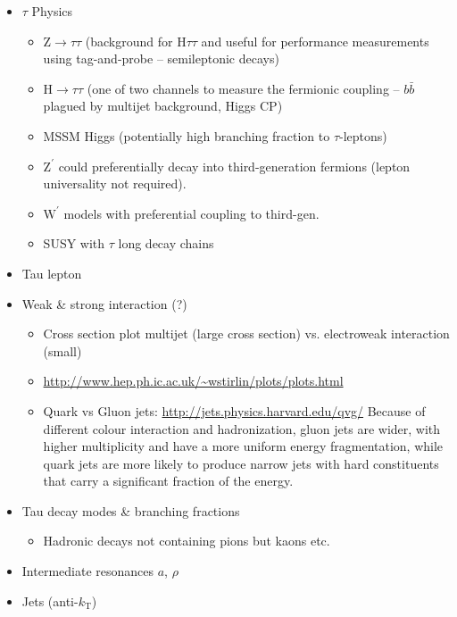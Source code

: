 \begin{itemize}
\begin{itemize}
\item $\tau$ Physics
  \begin{itemize}
  \item $\mathrm{Z} \rightarrow \tau \tau$ (background for H$\tau \tau$ and
    useful for performance measurements using tag-and-probe -- semileptonic
    decays)

  \item $\mathrm{H} \rightarrow \tau \tau$ (one of two channels to measure
    the fermionic coupling -- $b \bar{b}$ plagued by multijet background,
    Higgs CP)

  \item MSSM Higgs (potentially high branching fraction to $\tau$-leptons)

  \item $\mathrm{Z}^\prime$ could preferentially decay into third-generation
    fermions (lepton universality not required).

  \item $\mathrm{W}^\prime$ models with preferential coupling to third-gen.

  \item SUSY with $\tau$ \textrightarrow long decay chains
  \end{itemize}
\end{itemize}
\end{itemize}


\begin{itemize}
\item Tau lepton

\item Weak \& strong interaction (?)
  \begin{itemize}
  \item Cross section plot multijet (large cross section) vs.
    electroweak interaction (small)
  \item \url{http://www.hep.ph.ic.ac.uk/~wstirlin/plots/plots.html}
  \item Quark vs Gluon jets: \url{http://jets.physics.harvard.edu/qvg/}
    Because of different colour interaction and hadronization, gluon jets are
    wider, with higher multiplicity and have a more uniform energy
    fragmentation, while quark jets are more likely to produce narrow jets with
    hard constituents that carry a significant fraction of the energy.
  \end{itemize}

\item Tau decay modes \& branching fractions
  \begin{itemize}
  \item Hadronic decays not containing pions but kaons etc.
  \end{itemize}

\item Intermediate resonances $a$, $\rho$

\item Jets (anti-$k_\mathrm{T}$)

\end{itemize}

